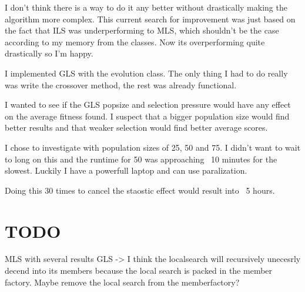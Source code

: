 \documentclass{article}
\begin{document}
\begin{empfile}
I don't think there is a way to do it any better without drastically making
the algorithm more complex.
This current search for improvement was just based on the fact that ILS was
underperforming to MLS, which shouldn't be the case according to my memory
from the classes. Now its overperforming quite drastically so I'm happy.

I implemented GLS with the evolution class. The only thing I had to do really
was write the crossover method, the rest was already functional.

I wanted to see if the GLS popsize and selection pressure would have any
effect on the average fitness found. I suspect that a bigger population size
would find better results and that weaker selection would find better
average scores.

I chose to investigate with population sizes of 25, 50 and 75. I didn't want
to wait to long on this and the runtime for 50 was approaching ~10 minutes
for the slowest. Luckily I have a powerfull laptop and can use paralization.

Doing this 30 times to cancel the staostic effect would result into ~5 hours.
\section{TODO}
MLS with several results
GLS -> I think the localsearch will recursively unecesrly decend into its members
because the local search is packed in the member factory. Maybe remove the
local search from the memberfactory?


\dataTable
{}

\end{empfile}
\end{document}
